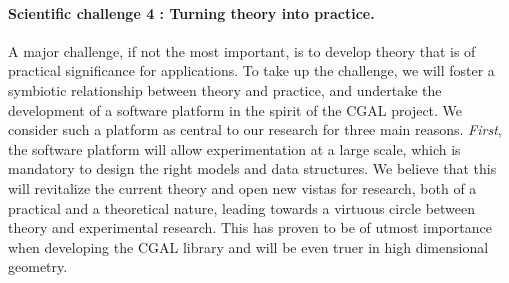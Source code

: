 



\paragraph{Scientific challenge 4 : Turning theory into practice.}%
A major challenge, if not the most important, is to develop theory that is of practical significance for applications.   To take up the challenge, we will foster a symbiotic relationship between theory and practice, and  undertake the development of a software platform in the spirit of the CGAL project. We consider such a platform as central to our research  for three main reasons.  {\em First}, the software platform will allow experimentation at a large scale, which is mandatory to design the right models and data structures. We believe that this will revitalize the current theory and open new vistas for research, both of a practical and a theoretical nature, leading towards a virtuous circle between theory and experimental research. This has proven to be of utmost importance when developing the CGAL library and will be even truer in high dimensional geometry.

